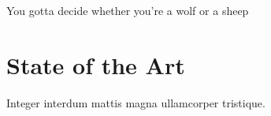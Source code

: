 

\begin{savequote}[50mm]
You gotta decide whether you’re a wolf or a sheep
%
\end{savequote}


\chapter{State of the Art}
\label{cha:stateoftheart}

\ifpdf
    \graphicspath{{2_state_of_the_art/figures/PNG/}{2_state_of_the_art/figures/PDF/}{2_state_of_the_art/figures/}}
\else
    \graphicspath{{2_state_of_the_art/figures/EPS/}{2_state_of_the_art/figures/}}
\fi




Integer interdum mattis magna ullamcorper tristique.





